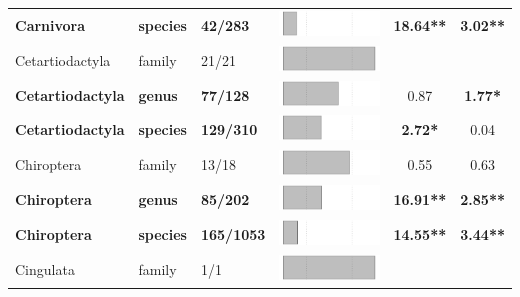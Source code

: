\begin{longtable}{lL{1.8cm}C{2cm}lcc}
  \textbf{Carnivora} & \textbf{species} & \textbf{42/283} & \includegraphics[width=0.20\linewidth, height=0.05\linewidth]{Missing_mammals/Table_figures/bar6.pdf} & \textbf{18.64**} & \textbf{3.02**} \\ 
  Cetartiodactyla & family & 21/21 & \includegraphics[width=0.20\linewidth, height=0.05\linewidth]{Missing_mammals/Table_figures/bar7.pdf} &   &   \\ 
  \textbf{Cetartiodactyla} & \textbf{genus} & \textbf{77/128} & \includegraphics[width=0.20\linewidth, height=0.05\linewidth]{Missing_mammals/Table_figures/bar8.pdf} & 0.87 & \textbf{1.77*} \\ 
  \textbf{Cetartiodactyla} & \textbf{species} & \textbf{129/310} & \includegraphics[width=0.20\linewidth, height=0.05\linewidth]{Missing_mammals/Table_figures/bar9.pdf} & \textbf{2.72*} & 0.04 \\ 
  Chiroptera & family & 13/18 & \includegraphics[width=0.20\linewidth, height=0.05\linewidth]{Missing_mammals/Table_figures/bar10.pdf} & 0.55 & 0.63 \\ 
  \textbf{Chiroptera} & \textbf{genus} & \textbf{85/202} & \includegraphics[width=0.20\linewidth, height=0.05\linewidth]{Missing_mammals/Table_figures/bar11.pdf} & \textbf{16.91**} & \textbf{2.85**} \\ 
  \textbf{Chiroptera} & \textbf{species} & \textbf{165/1053} & \includegraphics[width=0.20\linewidth, height=0.05\linewidth]{Missing_mammals/Table_figures/bar12.pdf} & \textbf{14.55**} & \textbf{3.44**} \\ 
  Cingulata & family & 1/1 & \includegraphics[width=0.20\linewidth, height=0.05\linewidth]{Missing_mammals/Table_figures/bar13.pdf} &   &   \\ 

\end{longtable}
